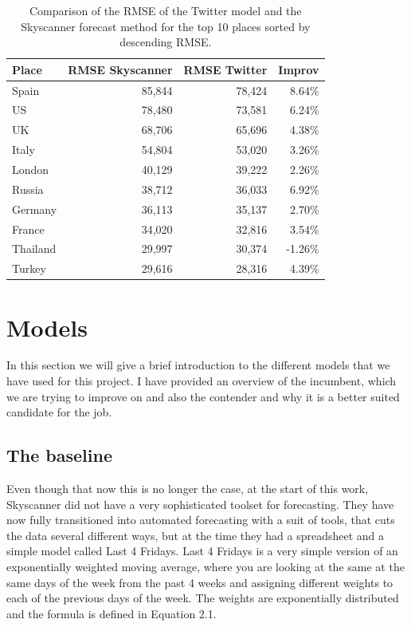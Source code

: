 \documentclass[minf,twoside,singlespacing,parskip,frontabs,notimes,12pt]{infthesis} %
\begin{document}
\begin{table}[h!]
\begin{center}
\begin{tabular}{ l | r | r | r }
Place & RMSE Skyscanner & RMSE Twitter  & Improv\\
\hline
Spain & 85,844 & 78,424  & 8.64\%\\
US & 78,480 & 73,581   & 6.24\%\\
UK & 68,706 & 65,696  & 4.38\%\\
Italy & 54,804 & 53,020  & 3.26\% \\
London & 40,129 & 39,222& 2.26\% \\
Russia & 38,712  & 36,033 & 6.92\%\\
Germany & 36,113 & 35,137 & 2.70\% \\
France & 34,020 & 32,816  & 3.54\%\\
Thailand & 29,997 & 30,374 & -1.26\%\\
Turkey & 29,616 & 28,316  & 4.39\%\\
\end{tabular}
\end{center}
\caption{Comparison of the RMSE of the Twitter model and the Skyscanner forecast method for the top 10 places sorted by descending RMSE. }
\label{big-table}
\end{table}

\chapter{Models}

In this section we will give a brief introduction to the different models that we have used for this project. I have provided an overview of the incumbent, which we are trying to improve on and also the contender and why it is a better suited candidate for the job. 



\section{The baseline}

Even though that now this is no longer the case, at the start of this work, Skyscanner did not have a very sophisticated toolset for forecasting. They have now fully transitioned into automated forecasting with a suit of tools, that cuts the data several different ways, but at the time they had a spreadsheet and a simple model called Last 4 Fridays. Last 4 Fridays is a very simple version of an exponentially weighted moving average, where you are looking at the same at the same days of the week from the past 4 weeks and assigning different weights to each of the previous days of the week. The weights are exponentially distributed and the formula is defined in Equation 2.1.
\end{document}
